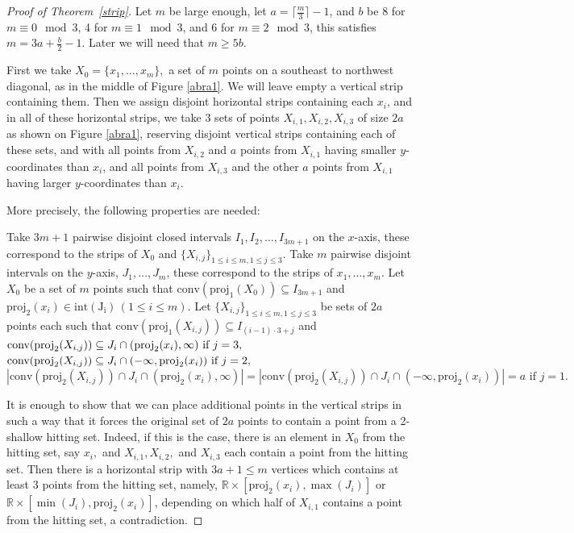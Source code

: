 \documentclass[10pt,a4paper]{amsart}
\newcommand{\R}{\mathbb{R}}
\begin{document}
\begin{proof}[Proof of Theorem~\ref{strip}]
Let $m$ be large enough, let $a= \lceil \frac{m}{3} \rceil-1$, and $b$ be 8 for $m \equiv 0 \mod 3$, 4 for $m \equiv 1 \mod 3$, and 6 for $m \equiv 2 \mod 3$, this satisfies $m=3a+ \frac{b}{2}-1$. Later we will need that $m\ge 5b$.

First we take $X_0=\{x_1,\ldots,x_m\},$ a set of $m$ points on a southeast to northwest diagonal, as in the middle of Figure \ref{abra1}. We will leave empty a vertical strip containing them. Then we assign disjoint horizontal strips containing each $x_i$, and in all of these horizontal strips, we take 3 sets of points $X_{i,1},X_{i,2},X_{i,3}$ of size $2a$ as shown on Figure \ref{abra1}, reserving disjoint vertical strips containing each of these sets, and with all points from $X_{i,2}$ and $a$ points from $X_{i,1}$ having smaller $y$-coordinates than $x_i$, and all points from $X_{i,3}$ and the other $a$ points from $X_{i,1}$ having larger $y$-coordinates than $x_i$. 

More precisely, the following properties are needed:

Take $3m+1$ pairwise disjoint closed intervals $I_1,I_2,\ldots,I_{3m+1}$ on the $x$-axis, these correspond to the strips of $X_0$ and $\{X_{i,j}\}_{1\le i\le m, 1\le j\le3}$. Take $m$ pairwise disjoint intervals on the $y$-axis, $J_1,\ldots,J_m$, these correspond to the strips of $x_1,\ldots,x_m$. Let $X_0$ be a set of $m$ points such that $\mathrm{conv}(\mathrm{proj}_1(X_0))\subseteq I_{3m+1}$ and $\mathrm{proj}_2(x_i)\in\mathrm{int(J_i)} \, (1\le i\le m).$ Let $\{X_{i,j}\}_{1\le i\le m, 1\le j\le3}$ be sets of $2a$ points each such that $\mathrm{conv}(\mathrm{proj}_1(X_{i,j}))\subseteq I_{(i-1)\cdot3+j}$ and \\
$\text{conv}(\text{proj}_2(X_{i,j}))\subseteq J_i\cap (\text{proj}_2(x_i),\infty)\hfill\text{ if } j=3,$\\
$\text{conv}(\text{proj}_2(X_{i,j}))\subseteq J_i\cap (-\infty,\text{proj}_2(x_i))\hfill\text{ if } j=2,$\\
$|\text{conv}(\text{proj}_2(X_{i,j}))\cap J_i\cap (\text{proj}_2(x_i),\infty)|=|\text{conv}(\text{proj}_2(X_{i,j}))\cap J_i\cap (-\infty,\text{proj}_2(x_i))|=a\text{ if } j=1.$


It is enough to show that we can place additional points in the vertical strips in such a way that it forces the original set of $2a$ points to contain a point from a 2-shallow hitting set. Indeed, if this is the case, there is an element in $X_0$ from the hitting set, say $x_i,$ and $X_{i,1},X_{i,2},$ and $X_{i,3}$ each contain a point from the hitting set. Then there is a horizontal strip with $3a+1\le m$ vertices which contains at least 3 points from the hitting set, namely, $\R\times[\text{proj}_2(x_i),\max(J_i)]$ or $\R\times[\min(J_i),\text{proj}_2(x_i)]$, depending on which half of $X_{i,1}$ contains a point from the hitting set, a contradiction.


\end{proof}
\end{document}
